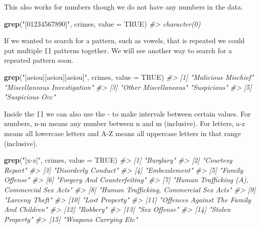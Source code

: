 \documentclass[
  12pt,
]{book}
\newenvironment{Shaded}{\begin{snugshade}}{\end{snugshade}}
\newcommand{\CommentTok}[1]{\textcolor[rgb]{0.56,0.35,0.01}{\textit{#1}}}
\newcommand{\DataTypeTok}[1]{\textcolor[rgb]{0.13,0.29,0.53}{#1}}
\newcommand{\KeywordTok}[1]{\textcolor[rgb]{0.13,0.29,0.53}{\textbf{#1}}}
\newcommand{\NormalTok}[1]{#1}
\newcommand{\OtherTok}[1]{\textcolor[rgb]{0.56,0.35,0.01}{#1}}
\newcommand{\StringTok}[1]{\textcolor[rgb]{0.31,0.60,0.02}{#1}}
\begin{document}
This also works for numbers though we do not have any numbers in the data.

\begin{Shaded}
\begin{Highlighting}[]
\KeywordTok{grep}\NormalTok{(}\StringTok{"[01234567890]"}\NormalTok{, crimes, }\DataTypeTok{value =} \OtherTok{TRUE}\NormalTok{)}
\CommentTok{\#> character(0)}
\end{Highlighting}
\end{Shaded}

If we wanted to search for a pattern, such as vowels, that is repeated we could put multiple \texttt{{[}{]}} patterns together. We will see another way to search for a repeated pattern soon.

\begin{Shaded}
\begin{Highlighting}[]
\KeywordTok{grep}\NormalTok{(}\StringTok{"[aeiou][aeiou][aeiou]"}\NormalTok{, crimes, }\DataTypeTok{value =} \OtherTok{TRUE}\NormalTok{)}
\CommentTok{\#> [1] "Malicious Mischief"          "Miscellaneous Investigation"}
\CommentTok{\#> [3] "Other Miscellaneous"         "Suspicious"                 }
\CommentTok{\#> [5] "Suspicious Occ"}
\end{Highlighting}
\end{Shaded}

Inside the \texttt{{[}{]}} we can also use the - to make intervals between certain values. For numbers, n-m means any number between n and m (inclusive). For letters, a-z means all lowercase letters and A-Z means all uppercase letters in that range (inclusive).

\begin{Shaded}
\begin{Highlighting}[]
\KeywordTok{grep}\NormalTok{(}\StringTok{"[x{-}z]"}\NormalTok{, crimes, }\DataTypeTok{value =} \OtherTok{TRUE}\NormalTok{)}
\CommentTok{\#>  [1] "Burglary"                                  }
\CommentTok{\#>  [2] "Courtesy Report"                           }
\CommentTok{\#>  [3] "Disorderly Conduct"                        }
\CommentTok{\#>  [4] "Embezzlement"                              }
\CommentTok{\#>  [5] "Family Offense"                            }
\CommentTok{\#>  [6] "Forgery And Counterfeiting"                }
\CommentTok{\#>  [7] "Human Trafficking (A), Commercial Sex Acts"}
\CommentTok{\#>  [8] "Human Trafficking, Commercial Sex Acts"    }
\CommentTok{\#>  [9] "Larceny Theft"                             }
\CommentTok{\#> [10] "Lost Property"                             }
\CommentTok{\#> [11] "Offences Against The Family And Children"  }
\CommentTok{\#> [12] "Robbery"                                   }
\CommentTok{\#> [13] "Sex Offense"                               }
\CommentTok{\#> [14] "Stolen Property"                           }
\CommentTok{\#> [15] "Weapons Carrying Etc"}
\end{Highlighting}
\end{Shaded}
\end{document}
